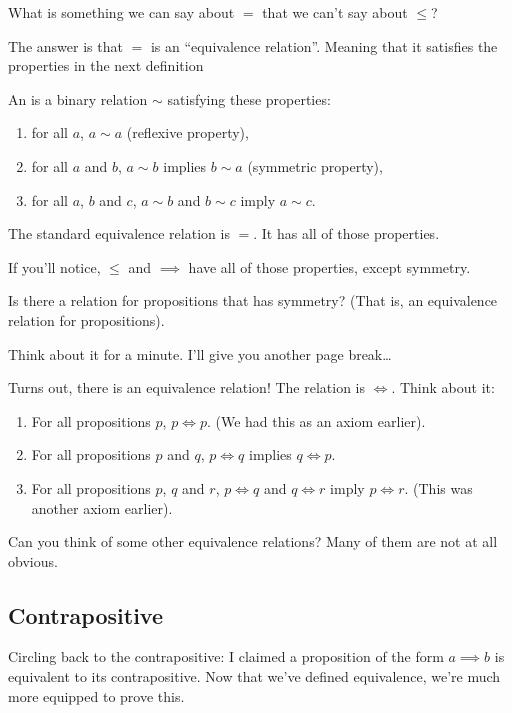 What is something we can say about $=$ that we can't say about $\le$?

The answer is that $=$ is an ``equivalence relation''. Meaning that it
satisfies the properties in the next definition

\begin{definition}
  An  is a binary relation $\sim$ satisfying
  these properties:

  \begin{enumerate}
  \item for all $a$, $a \sim a$ (reflexive property),
  \item for all $a$ and $b$, $a \sim b$ implies $b \sim a$ (symmetric
    property),
  \item for all $a$, $b$ and $c$, $a \sim b$ and $b \sim c$ imply
    $a \sim c$.
  \end{enumerate}
\end{definition}

The standard equivalence relation is $=$. It has all of those
properties.

If you'll notice, $\le$ and $\implies$ have all of those properties,
except symmetry.

Is there a relation for propositions that has symmetry? (That is, an
equivalence relation for propositions).

Think about it for a minute. I'll give you another page break\dots

\newpage

Turns out, there is an equivalence relation! The relation is
$\iff$. Think about it:

\begin{enumerate}
\item For all propositions $p$, $p \iff p$. (We had this as an axiom
  earlier).
\item For all propositions $p$ and $q$, $p \iff q$ implies $q \iff p$.
\item For all propositions $p$, $q$ and $r$, $p \iff q$ and $q \iff r$
  imply $p \iff r$. (This was another axiom earlier).
\end{enumerate}

Can you think of some other equivalence relations? Many of them are
not at all obvious.

\subsection{Contrapositive}

Circling back to the contrapositive: I claimed a proposition of the
form $a \implies b$ is equivalent to its contrapositive. Now that
we've defined equivalence, we're much more equipped to prove this.
